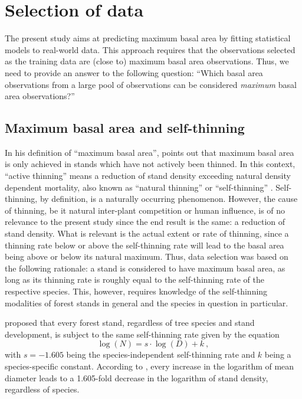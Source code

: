 \section{Selection of data}

The present study aims at predicting maximum basal area by fitting statistical models to real-world data.  This approach requires that the observations selected as the training data are (close to) maximum basal area observations.  Thus, we need to provide an answer to the following question: ``Which basal area observations from a large pool of observations can be considered \emph{maximum} basal area observations?''

\subsection{Maximum basal area and self-thinning}

In his definition of ``maximum basal area'', \textcite{Assmann1970} points out that maximum basal area is only achieved in stands which have not actively been thinned.  In this context, ``active thinning'' means a reduction of stand density exceeding natural density dependent mortality, also known as ``natural thinning'' \parencite{SAF1958} or ``self-thinning'' \parencite{Roehrig1992}.  Self-thinning, by definition, is a naturally occurring phenomenon.  However, the cause of thinning, be it natural inter-plant competition or human influence, is of no relevance to the present study since the end result is the same: a reduction of stand density.  What is relevant is the actual extent or rate of thinning, since a thinning rate below or above the self-thinning rate will lead to the basal area being above or below its natural maximum.  Thus, data selection was based on the following rationale: a stand is considered to have maximum basal area, as long as its thinning rate is roughly equal to the self-thinning rate of the respective species.  This, however, requires knowledge of the self-thinning modalities of forest stands in general and the species in question in particular.

\textcite{Reineke1933} proposed that every forest stand, regardless of tree species and stand development, is subject to the same self-thinning rate given by the equation
\begin{equation}
  \label{eq:reineke}
  \log (N) = s \cdot \log (D) + k ~,
\end{equation}
with \(s = -1.605\) being the species-independent self-thinning rate and \(k\) being a species-specific constant.  According to \textcite{Reineke1933}, every increase in the logarithm of mean diameter leads to a \num{1.605}-fold decrease in the logarithm of stand density, regardless of species.

